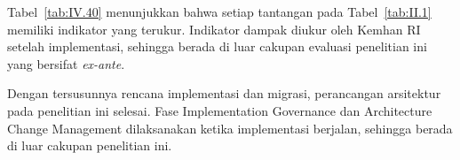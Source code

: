 Tabel~\ref{tab:IV.40} menunjukkan bahwa setiap tantangan pada Tabel~\ref{tab:II.1} memiliki indikator yang terukur. Indikator dampak diukur oleh Kemhan RI setelah implementasi, sehingga berada di luar cakupan evaluasi penelitian ini yang bersifat \textit{ex-ante}.

Dengan tersusunnya rencana implementasi dan migrasi, perancangan arsitektur pada penelitian ini selesai. Fase Implementation Governance dan Architecture Change Management dilaksanakan ketika implementasi berjalan, sehingga berada di luar cakupan penelitian ini.
